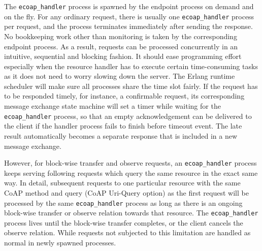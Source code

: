 The \verb|ecoap_handler| process is spawned by the endpoint process on demand and on the fly. For any ordinary request, there is usually one \verb|ecoap_handler| process per request, and the process terminates immediately after sending the response. No  bookkeeping work other than monitoring is taken by the corresponding endpoint process. As a result, requests can be processed concurrently in an intuitive, sequential and blocking fashion. It should ease programming effort especially when the resource handler has to execute certain time-consuming tasks as it does not need to worry slowing down the server. The Erlang runtime scheduler will make sure all processes share the time slot fairly. If the request has to be responded timely, for instance, a confirmable request, its corresponding message exchange state machine will set a timer while waiting for the \verb|ecoap_handler| process, so that an empty acknowledgement can be delivered to the client if the handler process fails to finish before timeout event. The late result automatically becomes a separate response that is included in a new message exchange. 

However, for block-wise transfer and observe requests, an \verb|ecoap_handler| process keeps serving following requests which query the same resource in the exact same way. In detail, subsequent requests to one particular resource with the same CoAP method and query (CoAP Uri-Query option) as the first request will be processed by the same \verb|ecoap_handler| process as long as there is an ongoing block-wise transfer or observe relation towards that resource. The \verb|ecoap_handler| process lives until the block-wise transfer completes, or the client cancels the observe relation. While requests not subjected to this limitation are handled as normal in newly spawned processes.

